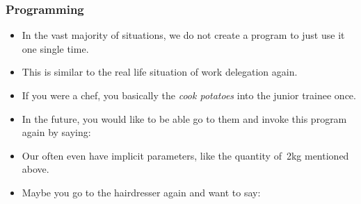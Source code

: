 \documentclass[aspectratio=169,mathserif,notheorems]{beamer}%
\begin{document}
\begin{frame}%
\frametitle{Programming}%
\begin{itemize}%
\item In the vast majority of situations, we do not create a program to just use it one single time.%
\item<2-> This is similar to the real life situation of work delegation again.
\item<3-> If you were a chef, you basically  the  \emph{cook potatoes} into the junior trainee once.
\item<4-> In the future, you would like to be able go to them and invoke this program again by saying:~
\item<5-> Our  often even have implicit parameters, like the quantity of~2kg mentioned above.
\item<6-> Maybe you go to the hairdresser again and want to say: %
\end{itemize}%
\end{frame}%
%
\end{document}
